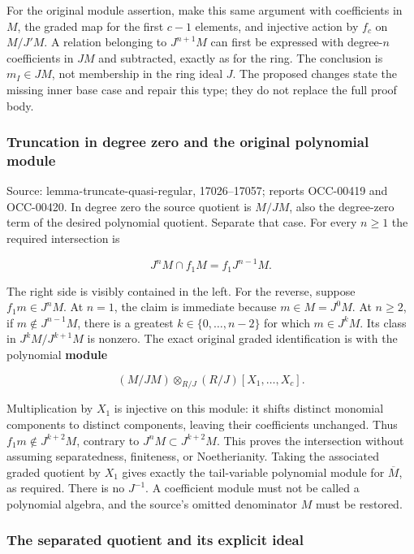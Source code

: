 For the original module assertion, make this same argument with coefficients in \(M\), the graded map for the first \(c-1\) elements, and injective action by \(f_c\) on \(M/J'M\). A relation belonging to \(J^{n+1}M\) can first be expressed with degree-\(n\) coefficients in \(JM\) and subtracted, exactly as for the ring. The conclusion is \(m_I\in JM\), not membership in the ring ideal \(J\). The proposed changes state the missing inner base case and repair this type; they do not replace the full proof body.

\subsubsection{Truncation in degree zero and the original polynomial module}\label{algebra-proof-006-truncation-in-degree-zero-and-the-original-polynomial-module}

Source: lemma-truncate-quasi-regular, 17026--17057; reports OCC-00419 and OCC-00420. In degree zero the source quotient is \(M/JM\), also the degree-zero term of the desired polynomial quotient. Separate that case. For every \(n\geq1\) the required intersection is

\[
J^nM\cap f_1M=f_1J^{n-1}M.
\]

The right side is visibly contained in the left. For the reverse, suppose \(f_1m\in J^nM\). At \(n=1\), the claim is immediate because \(m\in M=J^0M\). At \(n\geq2\), if \(m\notin J^{n-1}M\), there is a greatest \(k\in\{0,\ldots,n-2\}\) for which \(m\in J^kM\). Its class in \(J^kM/J^{k+1}M\) is nonzero. The exact original graded identification is with the polynomial \textbf{module}

\[
(M/JM)\otimes_{R/J}(R/J)[X_1,\ldots,X_c].
\]

Multiplication by \(X_1\) is injective on this module: it shifts distinct monomial components to distinct components, leaving their coefficients unchanged. Thus \(f_1m\notin J^{k+2}M\), contrary to \(J^nM\subset J^{k+2}M\). This proves the intersection without assuming separatedness, finiteness, or Noetherianity. Taking the associated graded quotient by \(X_1\) gives exactly the tail-variable polynomial module for \(\overline M\), as required. There is no \(J^{-1}\). A coefficient module must not be called a polynomial algebra, and the source's omitted denominator \(M\) must be restored.

\subsubsection{The separated quotient and its explicit ideal}\label{algebra-proof-006-the-separated-quotient-and-its-explicit-ideal}

